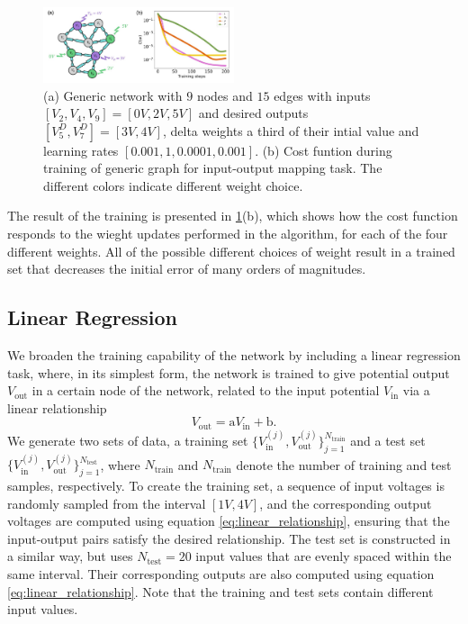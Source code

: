 \documentclass[reprint,superscriptaddress,prb,showkeys]{revtex4-2}
\begin{document}
\begin{figure}[h]
    \centering
    \includegraphics[width=0.5\textwidth]{plots/general_network/mse_general.pdf}
    \caption{(a) Generic network with $9$ nodes and $15$ edges with inputs $[V_{2}, V_{4}, V_{9}] = [0V, 2V, 5V]$ and desired outputs $[V_{5}^D, V_{7}^D] = [3V, 4V]$, delta weights a third of their intial value and learning rates $[0.001, 1, 0.0001, 0.001]$. (b) Cost funtion during training of generic graph for input-output mapping task. The different colors indicate different weight choice.}\label{fig:mse_general}
\end{figure} 

The result of the training is presented in \cref{fig:mse_general}(b), which shows how the cost function responds to the wieght updates performed in the algorithm, for each of the four different weights. All of the possible different choices of weight result in a trained set that decreases the initial error of many orders of magnitudes. 

\subsection{Linear Regression}

We broaden the training capability of the network by including a linear regression task, where, in its simplest form, the network is trained to give potential output $V_{\text{out}}$ in a certain node of the network, related to the input potential $V_{\text{in}}$ via a linear relationship
\begin{equation}
    V_{\text{out}} = \text{a} V_{\text{in}} + \text{b}.
\label{eq:linear_relationship}
\end{equation}
We generate two sets of data, a training set $ \{ V_{\text{in}}^{(j)}, V_{\text{out}}^{(j)} \}_{j=1}^{N_{\text{train}}}$ and a test set $ \{ V_{\text{in}}^{(j)}, V_{\text{out}}^{(j)} \}_{j=1}^{N_{\text{test}}}$, where $N_{\text{train}}$ and $N_{\text{train}}$ denote the number of training and test samples, respectively. To create the training set, a sequence of input voltages is randomly sampled from the interval $[1V, 4V]$, and the corresponding output voltages are computed using equation \cref{eq:linear_relationship}, ensuring that the input-output pairs satisfy the desired relationship.
The test set is constructed in a similar way, but uses $N_{\text{test}}=20$ input values that are evenly spaced within the same interval. Their corresponding outputs are also computed using equation \cref{eq:linear_relationship}. Note that the training and test sets contain different input values.
\end{document}
